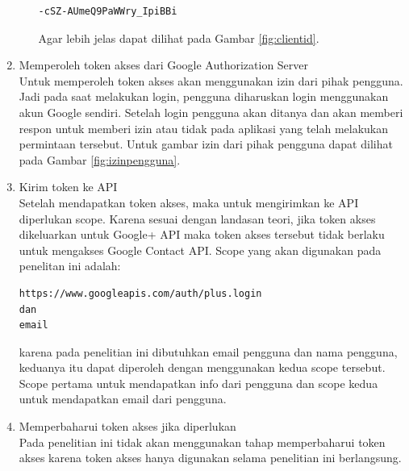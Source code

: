 \begin{enumerate}
\begin{enumerate}
\begin{lstlisting}
-cSZ-AUmeQ9PaWWry_IpiBBi
\end{lstlisting}
Agar lebih jelas dapat dilihat pada Gambar \ref{fig:clientid}.
    \end{enumerate}
\item Memperoleh token akses dari Google Authorization Server\\
Untuk memperoleh token akses akan menggunakan izin dari pihak pengguna. Jadi pada saat melakukan login, pengguna diharuskan login menggunakan akun Google sendiri. Setelah login pengguna akan ditanya dan akan memberi respon untuk memberi izin atau tidak pada aplikasi yang telah melakukan permintaan tersebut. Untuk gambar izin dari pihak pengguna dapat dilihat pada Gambar \ref{fig:izinpengguna}.
\item Kirim token ke API\\
Setelah mendapatkan token akses, maka untuk mengirimkan ke API diperlukan scope. Karena sesuai dengan landasan teori, jika token akses dikeluarkan untuk Google+ API maka token akses tersebut tidak berlaku untuk mengakses Google Contact API. Scope yang akan digunakan pada penelitan ini adalah:
\begin{lstlisting}
https://www.googleapis.com/auth/plus.login
dan
email
\end{lstlisting}
karena pada penelitian ini dibutuhkan email pengguna dan nama pengguna, keduanya itu dapat diperoleh dengan menggunakan kedua scope tersebut. Scope pertama untuk mendapatkan info dari pengguna dan scope kedua untuk mendapatkan email dari pengguna.
\item Memperbaharui token akses jika diperlukan\\
Pada penelitian ini tidak akan menggunakan tahap memperbaharui token akses karena token akses hanya digunakan selama penelitian ini berlangsung.
\end{enumerate}


